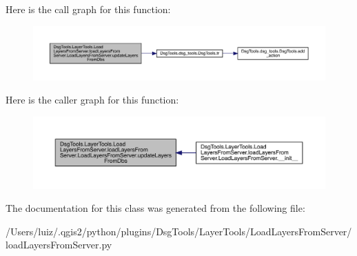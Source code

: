 \begin{DoxyVerb}\end{DoxyVerb}
 Here is the call graph for this function\+:
\nopagebreak
\begin{figure}[H]
\begin{center}
\leavevmode
\includegraphics[width=350pt]{class_dsg_tools_1_1_layer_tools_1_1_load_layers_from_server_1_1load_layers_from_server_1_1_load_layers_from_server_a48c6d0c4e050cbc1d7b9d882b7c6facc_cgraph}
\end{center}
\end{figure}
Here is the caller graph for this function\+:
\nopagebreak
\begin{figure}[H]
\begin{center}
\leavevmode
\includegraphics[width=350pt]{class_dsg_tools_1_1_layer_tools_1_1_load_layers_from_server_1_1load_layers_from_server_1_1_load_layers_from_server_a48c6d0c4e050cbc1d7b9d882b7c6facc_icgraph}
\end{center}
\end{figure}


The documentation for this class was generated from the following file\+:\begin{DoxyCompactItemize}
\item 
/\+Users/luiz/.\+qgis2/python/plugins/\+Dsg\+Tools/\+Layer\+Tools/\+Load\+Layers\+From\+Server/load\+Layers\+From\+Server.\+py\end{DoxyCompactItemize}
